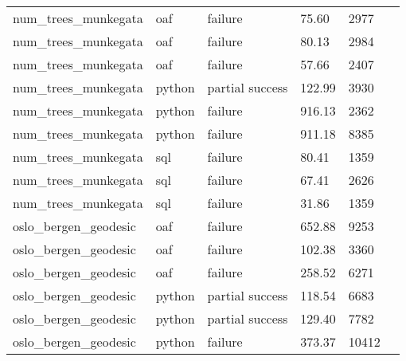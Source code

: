 \begin{longtable}{lp{1.8cm}p{1.8cm}p{1.8cm}p{1.8cm}p{1.8cm}}
    num\_trees\_munkegata      & oaf                          & failure          & 75.60                         & 2977            \\
    num\_trees\_munkegata      & oaf                          & failure          & 80.13                         & 2984            \\
    num\_trees\_munkegata      & oaf                          & failure          & 57.66                         & 2407            \\
    num\_trees\_munkegata      & python                       & partial success  & 122.99                        & 3930            \\
    num\_trees\_munkegata      & python                       & failure          & 916.13                        & 2362            \\
    num\_trees\_munkegata      & python                       & failure          & 911.18                        & 8385            \\
    num\_trees\_munkegata      & sql                          & failure          & 80.41                         & 1359            \\
    num\_trees\_munkegata      & sql                          & failure          & 67.41                         & 2626            \\
    num\_trees\_munkegata      & sql                          & failure          & 31.86                         & 1359            \\
    oslo\_bergen\_geodesic     & oaf                          & failure          & 652.88                        & 9253            \\
    oslo\_bergen\_geodesic     & oaf                          & failure          & 102.38                        & 3360            \\
    oslo\_bergen\_geodesic     & oaf                          & failure          & 258.52                        & 6271            \\
    oslo\_bergen\_geodesic     & python                       & partial success  & 118.54                        & 6683            \\
    oslo\_bergen\_geodesic     & python                       & partial success  & 129.40                        & 7782            \\
    oslo\_bergen\_geodesic     & python                       & failure          & 373.37                        & 10412           \\

\end{longtable}
